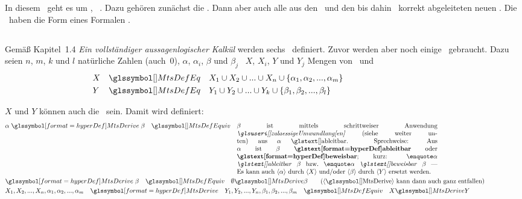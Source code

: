 \section[Schlussregeln]{\Schlussregeln}%
\beginsection          {\Schlussregeln}
\label              {sec-Schlussregeln}

In diesem \sectionname\ geht es um \zulaessigeUmwandlungen, \textdh\ \allgemeingueltigeSchlussregeln.
Dazu gehören zunächst die \Basisregeln.
Dann aber auch alle aus den \Basisregeln\ und den bis dahin \allgemeingueltigenSchlussregeln\ korrekt abgeleiteten neuen \Schlussregeln.
Die \Schlussregeln\ haben die Form eines Formalen \Satzes.

\subsection[Basisregeln]{\Basisregeln}%
\label               {sub-Basisregeln}

Gemäß \cite{bib:Rautenberg} Kapitel~1.4 \emph{Ein vollständiger aussagenlogischer Kalkül} werden sechs \Basisregeln\ definiert. Zuvor werden aber noch einige \Definitionen\ gebraucht. Dazu seien $n$, $m$, $k$ und $l$ natürliche Zahlen (auch~0), $\alpha$, $\alpha_i$, $\beta$ und $\beta_j$ \Formeln\, $X$, $X_i$, $Y$ und $Y_j$ Mengen von \Formeln\ und
\begin{align}
	&X&&\MtsDefEq&&X_1\cup X_2\cup...\cup X_n\cup\{\alpha_1,\alpha_2,...,\alpha_m\}
	\\
	&Y&&\MtsDefEq&&Y_1\cup Y_2\cup...\cup Y_k\cup\{\beta_1, \beta_2, ...,\beta_l \}
	\formulatoleft\formulatoleft
\end{align}

$X$ und $Y$ können auch die \leereMenge\ sein. Damit wird definiert:
\begin{align}
	& \alpha \defSymBin{\MtsDerive} \beta \quad \MtsDefEquiv \quad
	\parbox[t]{11cm}{%
	$\beta$ ist mittels schrittweiser Anwendung \emph{\zulaessigerUmwandlungen} (siehe weiter unten) aus $\alpha$ \ableitbar.
	Sprechweise: Aus $\alpha$ ist $\beta$ \defTxt{\ableitbar} oder \defTxt{\beweisbar};
	kurz: \standsfor{$\alpha$ \emph{\ableitbar} $\beta$} \textbzw\ \standsfor{$\alpha$ \emph{\beweisbar} $\beta$}
	--- Es kann auch \chrqt{$\alpha$} durch \chrqt{$X$} und/oder \chrqt{$\beta$} durch \chrqt{$Y$} ersetzt werden.
	}
	\label{def-ableitbar}
	\\
	& \defSymUna{\MtsDerive} \beta \quad \MtsDefEquiv \quad \emptyset \MtsDerive \beta \qquad \text{(\chrqt{\MtsDerive} kann dann auch ganz entfallen)}
	\\
	& X_1,X_2,...,X_n,\alpha_1,\alpha_2,...,\alpha_m\quad
	\defSym{\MtsDerive}\quad Y_1,Y_2,...,Y_n, \beta_1, \beta_2,..., \beta_m\quad
	\MtsDefEquiv \quad X \MtsDerive Y
	\label{def-ableitbarKurz}
	\formulatoleft
\end{align}

